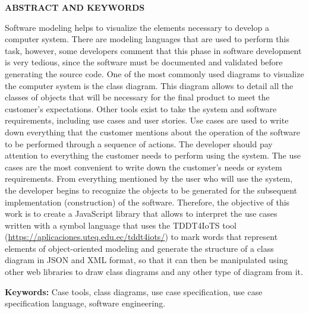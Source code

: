 \begin{center}
	{\titulodc \textbf{ABSTRACT AND KEYWORDS}}
\end{center}

Software modeling helps to visualize the elements necessary to develop a computer system. There are modeling languages that are used to perform this task, however, some developers comment that this phase in software development is very tedious, since the software must be documented and validated before generating the source code. One of the most commonly used diagrams to visualize the computer system is the class diagram. This diagram allows to detail all the classes of objects that will be necessary for the final product to meet the customer's expectations. Other tools exist to take the system and software requirements, including use cases and user stories. Use cases are used to write down everything that the customer mentions about the operation of the software to be performed through a sequence of actions. The developer should pay attention to everything the customer needs to perform using the system. The use cases are the most convenient to write down the customer's needs or system requirements. From everything mentioned by the user who will use the system, the developer begins to recognize the objects to be generated for the subsequent implementation (construction) of the software. Therefore, the objective of this work is to create a JavaScript library that allows to interpret the use cases written with a symbol language that uses the TDDT4IoTS tool (\url{https://aplicaciones.uteq.edu.ec/tddt4iots/}) to mark words that represent elements of object-oriented modeling and generate the structure of a class diagram in JSON and XML format, so that it can then be manipulated using other web libraries to draw class diagrams and any other type of diagram from it.

\textbf{Keywords:} Case tools, class diagrams, use case specification, use case specification language, software engineering.